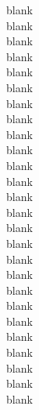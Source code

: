 \documentclass{article}
\begin{document}
\begin{multicols}{3}
blank\\
blank\\
blank\\
blank\\
blank\\
blank\\
blank\\
blank\\
blank\\
blank\\
blank\\
blank\\
blank\\
blank\\
blank\\
blank\\
blank\\
blank\\
blank\\
blank\\
blank\\
blank\\
blank\\
blank\\
blank\\
blank\\

\end{multicols}
 
\end{document}
